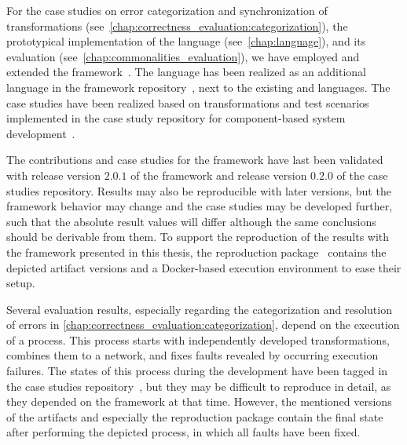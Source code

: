 For the case studies on error categorization and synchronization of transformations (see~\autoref{chap:correctness_evaluation:categorization}), the prototypical implementation of the \commonalities language (see~\autoref{chap:language}), and its evaluation (see~\autoref{chap:commonalities_evaluation}), we have employed and extended the \vitruv framework~\cite{klare2021Vitruv-JSS}.
The \commonalities language has been realized as an additional language in the \vitruv framework repository~\cite{vitruvFrameworkGithub}, next to the existing \reactions and \mappings languages.
The case studies have been realized based on transformations and test scenarios implemented in the case study repository for component-based system development~\cite{vitruvCBSEGithub}.

The contributions and case studies for the \vitruv framework have last been validated with release version $2.0.1$ of the framework and release version $0.2.0$ of the case studies repository.
Results may also be reproducible with later versions, but the framework behavior may change and the case studies may be developed further, such that the absolute result values will differ although the same conclusions should be derivable from them.
To support the reproduction of the results with the \vitruv framework presented in this thesis, the reproduction package~\cite{klare2021diss-reproduction} contains the depicted artifact versions and a Docker-based execution environment to ease their setup.

Several evaluation results, especially regarding the categorization and resolution of errors in \autoref{chap:correctness_evaluation:categorization}, depend on the execution of a process.
This process starts with independently developed transformations, combines them to a network, and fixes faults revealed by occurring execution failures.
The states of this process during the development have been tagged in the case studies repository~\cite{vitruvCBSEGithub}, but they may be difficult to reproduce in detail, as they depended on the framework at that time.
However, the mentioned versions of the artifacts and especially the reproduction package contain the final state after performing the depicted process, in which all faults have been fixed.

